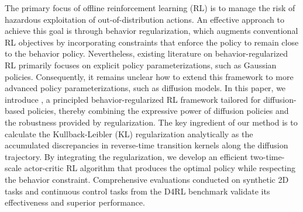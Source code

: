 The primary focus of offline reinforcement learning (RL) is to manage the risk of hazardous exploitation of out-of-distribution actions. An effective approach to achieve this goal is through behavior regularization, which augments conventional RL objectives by incorporating constraints that enforce the policy to remain close to the behavior policy. 
Nevertheless, existing literature on behavior-regularized RL primarily focuses on explicit policy parameterizations, such as Gaussian policies. Consequently, it remains unclear how to extend this framework to more advanced policy parameterizations, such as diffusion models. In this paper, we introduce \algbb, a principled behavior-regularized RL framework tailored for diffusion-based policies, thereby combining the expressive power of diffusion policies and the robustness provided by regularization. The key ingredient of our method is to calculate the Kullback-Leibler (KL) regularization analytically as the accumulated discrepancies in reverse-time transition kernels along the diffusion trajectory. By integrating the regularization, we develop an efficient two-time-scale actor-critic RL algorithm that produces the optimal policy while respecting the behavior constraint.
Comprehensive evaluations conducted on synthetic 2D tasks and continuous control tasks from the D4RL benchmark validate its effectiveness and superior performance.